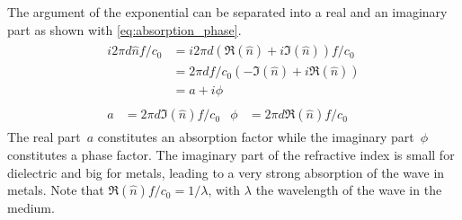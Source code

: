 The argument of the exponential can be separated into a real and an imaginary part as shown with \cref{eq:absorption_phase}.
\begin{gather}
    \begin{aligned}
        i 2\pi d \hat{n} f / c_0
        &= i 2\pi d \left(\Re(\hat{n}) + i\Im(\hat{n})\right) f / c_0 \\
        &= 2\pi d f / c_0 \left(-\Im(\hat{n}) + i\Re(\hat{n}) \right) \\
        &= a + i \phi
    \end{aligned}
    \label{eq:absorption_phase}
    \\
    \begin{aligned}
        a &= 2\pi d \Im(\hat{n}) f / c_0   &   \phi &= 2\pi d \Re(\hat{n}) f / c_0
    \end{aligned}
\end{gather}
The real part~$a$ constitutes an absorption factor while the imaginary part~$\phi$ constitutes a phase factor.
The imaginary part of the refractive index is small for dielectric and big for metals,
leading to a very strong absorption of the wave in metals.
Note that $\Re(\hat{n}) f / c_0 = 1 / \lambda$, with $\lambda$ the wavelength of the wave in the medium.

